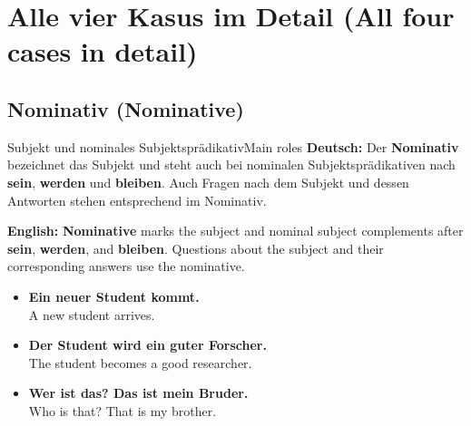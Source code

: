 \documentclass[a4paper,11pt]{article}
\newcommand{\GermanText}[1]{\textbf{Deutsch: }#1\par}
\newcommand{\EnglishText}[1]{{\small\color{SoftGray}\textbf{English: }#1\par}}
\newcommand{\ExampleItem}[2]{\item \textbf{#1}\\{\small\color{SoftGray}#2}}
\begin{document}
    \section{Alle vier Kasus im Detail \textnormal{(All four cases in detail)}}
        \subsection{Nominativ \textnormal{(Nominative)}}
            \begin{grammarentry}{Subjekt und nominales Subjektsprädikativ}{Main roles}
                \GermanText{Der \textbf{Nominativ} bezeichnet das Subjekt und steht auch bei nominalen Subjektsprädikativen nach \textbf{sein}, \textbf{werden} und \textbf{bleiben}. Auch Fragen nach dem Subjekt und dessen Antworten stehen entsprechend im Nominativ.}
                \EnglishText{\textbf{Nominative} marks the subject and nominal subject complements after \textbf{sein}, \textbf{werden}, and \textbf{bleiben}. Questions about the subject and their corresponding answers use the nominative.}
            \end{grammarentry}
            \begin{exbox}\begin{itemize}
                \ExampleItem{Ein neuer Student kommt.}{A new student arrives.}
                \ExampleItem{Der Student wird ein guter Forscher.}{The student becomes a good researcher.}
                \ExampleItem{Wer ist das? Das ist mein Bruder.}{Who is that? That is my brother.}
            \end{itemize}\end{exbox}
\end{document}
